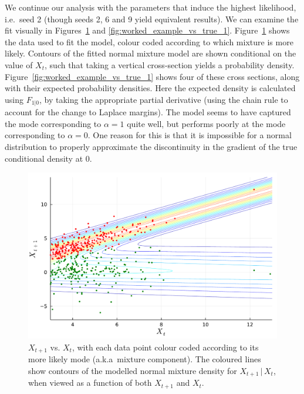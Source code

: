 \documentclass[11pt,twoside,openany]{book}
\numberwithin{Theorem}{chapter}
\numberwithin{Definition}{chapter}
\numberwithin{Lemma}{chapter}
\numberwithin{Algorithm}{chapter}
\numberwithin{equation}{chapter}
\begin{document}
We continue our analysis with the parameters that induce the highest
likelihood, i.e.\ seed 2 (though seeds 2, 6 and 9 yield equivalent results).
We can examine the fit visually in Figures~\ref{fig:worked_example_contour_1} and
\ref{fig:worked_example_vs_true_1}. Figure~\ref{fig:worked_example_contour_1}
shows the data used to fit the model, colour coded according to which mixture is
more likely. Contours of the fitted normal mixture model are shown conditional on the value of $X_t$,
such that taking a vertical cross-section yields a probability density.
Figure~\ref{fig:worked_example_vs_true_1} shows four of these cross sections,
along with their expected probability densities. Here the expected density
is calculated using $F_{1|0}$, by taking the appropriate partial derivative
(using the chain rule to account for the change to Laplace margins).
The model seems to have captured the mode corresponding to $\alpha=1$ quite well,
but performs poorly at the mode corresponding to $\alpha=0$. One reason for
this is that it is impossible for a normal distribution to properly approximate
the discontinuity in the gradient of the true conditional density at $0$.
\begin{figure}[htp]
  \centering
  \includegraphics[scale=0.7]{../ht-em/figures/worked_example_contour_fit.pdf}
  \caption{$X_{t+1}$ vs. $X_t$, with each data point colour coded according to
    its more likely mode (a.k.a\ mixture component). The coloured
    lines show contours of the modelled normal mixture density
    for $X_{t+1}\,|\,X_{t}$, when viewed as a function of both $X_{t+1}$ and $X_{t}$.
}\label{fig:worked_example_contour_1}
\end{figure}
\end{document}
